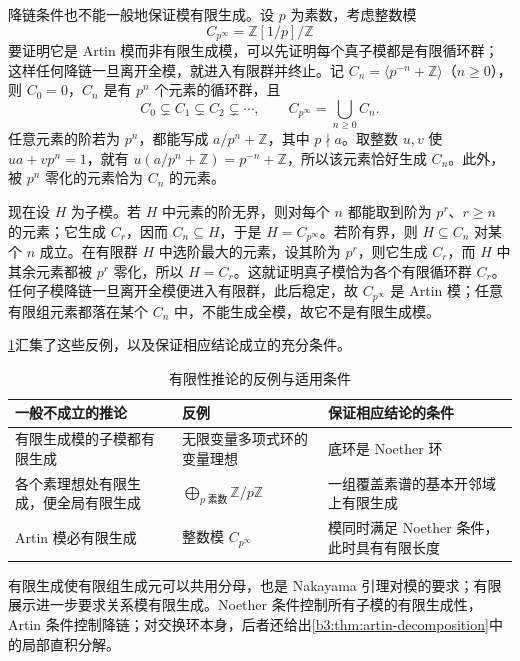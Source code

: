 \ProseParagraphBreak
降链条件也不能一般地保证模有限生成。设 \(p\) 为素数，考虑整数模
\[
	C_{p^\infty}=\mathbb Z[1/p]/\mathbb Z
\]
要证明它是 Artin 模而非有限生成模，可以先证明每个真子模都是有限循环群；这样任何降链一旦离开全模，就进入有限群并终止。记 \(C_n=\langle p^{-n}+\mathbb Z\rangle\)（\(n\ge0\)），则 \(C_0=0\)，\(C_n\) 是有 \(p^n\) 个元素的循环群，且
\[
	C_0\subsetneq C_1\subsetneq C_2\subsetneq\cdots, \qquad C_{p^\infty}=\bigcup_{n\ge0}C_n.
\]
任意元素的阶若为 \(p^n\)，都能写成 \(a/p^n+\mathbb Z\)，其中 \(p\nmid a\)。取整数 \(u,v\) 使 \(ua+vp^n=1\)，就有 \(u(a/p^n+\mathbb Z)=p^{-n}+\mathbb Z\)，所以该元素恰好生成 \(C_n\)。此外，被 \(p^n\) 零化的元素恰为 \(C_n\) 的元素。

\ProseParagraphBreak
现在设 \(H\) 为子模。若 \(H\) 中元素的阶无界，则对每个 \(n\) 都能取到阶为 \(p^r\)、\(r\ge n\) 的元素；它生成 \(C_r\)，因而 \(C_n\subseteq H\)，于是 \(H=C_{p^\infty}\)。若阶有界，则 \(H\subseteq C_n\) 对某个 \(n\) 成立。在有限群 \(H\) 中选阶最大的元素，设其阶为 \(p^r\)，则它生成 \(C_r\)，而 \(H\) 中其余元素都被 \(p^r\) 零化，所以 \(H=C_r\)。这就证明真子模恰为各个有限循环群 \(C_r\)。任何子模降链一旦离开全模便进入有限群，此后稳定，故 \(C_{p^\infty}\) 是 Artin 模；任意有限组元素都落在某个 \(C_n\) 中，不能生成全模，故它不是有限生成模。

\ProseParagraphBreak
\cref{b3:tab:finiteness-counterexamples}汇集了这些反例，以及保证相应结论成立的充分条件。

\begin{table}[htbp]
	\centering
	\caption{有限性推论的反例与适用条件}
	\label{b3:tab:finiteness-counterexamples}
	\begin{tabularx}{\textwidth}{@{}>{\raggedright\arraybackslash}p{}>{\raggedright\arraybackslash}p{}>{\raggedright\arraybackslash}X@{}}
		\toprule
		一般不成立的推论 & 反例 & 保证相应结论的条件\\
		\midrule
		有限生成模的子模都有限生成 & 无限变量多项式环的变量理想 & 底环是 Noether 环\\
		各个素理想处有限生成，便全局有限生成 & \(\bigoplus_{p\;\text{素数}}\mathbb Z/p\mathbb Z\) & 一组覆盖素谱的基本开邻域上有限生成\\
		Artin 模必有限生成 & 整数模 \(C_{p^\infty}\) & 模同时满足 Noether 条件，此时具有有限长度\\
		\bottomrule
	\end{tabularx}
\end{table}

有限生成使有限组生成元可以共用分母，也是 Nakayama 引理对模的要求；有限展示进一步要求关系模有限生成。Noether 条件控制所有子模的有限生成性，Artin 条件控制降链；对交换环本身，后者还给出\cref{b3:thm:artin-decomposition}中的局部直积分解。
